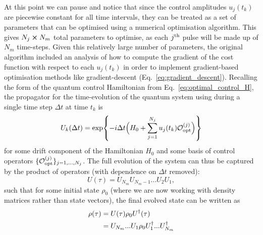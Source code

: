 At this point we can pause and notice that since the control amplitudes $u_j(t_k)$ are piecewise constant for all time intervals, they can be treated as a set of parameters that can be optimised using a numerical optimisation algorithm. This gives $N_j \cross N_m$ total parameters to optimise, as each $j^{\rm th}$ pulse will be made up of $N_m$ time-steps. Given this relatively large number of parameters, the original  algorithm included an analysis of how to compute the gradient of the cost function with respect to each $u_j(t_k)$ in order to implement gradient-based optimisation methods like gradient-descent (Eq.~\eqref{eq:gradient_descent}). Recalling the form of the quantum control Hamiltonian from Eq.~\eqref{eq:optimal_control_H}, the propagator for the time-evolution of the quantum system using  during a single time step $\Delta t$ at time $t_k$ is
\begin{equation}
    U_k(\Delta t) = \exp{- i \Delta t \Big( H_0 + \sum_{j=1}^{N_j} u_j(t_k) \mathcal{O}_{\rm opt}^{(j)} \Big)}
\end{equation}
for some drift component of the Hamiltonian $H_0$ and some basis of control operators $\{\mathcal{O}_{\rm opt}^{(j)}\}_{j = 1,...,N_j}$. The full evolution of the system can thus be captured by the product of operators (with dependence on $\Delta t$ removed):
\begin{equation}
    U(\tau) = U_{N_m} U_{N_m - 1} ... U_{2} U_{1},
\end{equation}
such that for some initial state $\rho_0$ (where we are now working with density matrices rather than state vectors), the final evolved state can be written as
\begin{equation}\label{eq:grape_rho_evolved}
    \begin{aligned}
        \rho(\tau) &= U(\tau)\rho_0 U^{\dagger}(\tau) \\
        &= U_{N_m} ... U_{1} \rho_0 U^{\dagger}_{1} ... U^{\dagger}_{N_m}
    \end{aligned}
\end{equation}

